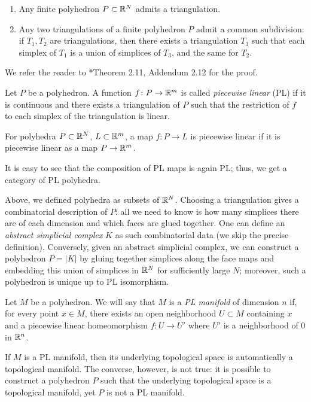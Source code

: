 \begin{theorem}\label{t:triangulation1}
  \par\noindent
  \begin{enumerate}
  \item
    Any finite polyhedron $P\subset \mathbb{R}^N$ admits a triangulation.
  \item
    Any two triangulations of a finite polyhedron $P$ admit a common
    subdivision: if $T_1,T_2$ are triangulations, then there exists a
    triangulation $T_3$ such that each simplex of $T_1$ is a union of simplices
    of $T_3$, and the same for $T_2$.
   \end{enumerate}
\end{theorem}
We refer the reader to *{Theorem 2.11, Addendum 2.12} for
the proof.
\begin{definition}
  Let $P$ be a polyhedron. A function $f\colon P\to \mathbb{R}^m$ is called \emph{%
  piecewise linear} (PL) if it is continuous and there exists a triangulation of
  $P$ such that the restriction of $f$ to each simplex of the triangulation
  is linear.

  For polyhedra $P\subset \mathbb{R}^N$, $L\subset \mathbb{R}^m$, a map $f\colon P\to L$
  is piecewise linear if it is piecewise linear as a map $P\to \mathbb{R}^m$.
\end{definition}
It is easy to see that the composition of PL maps is again PL; thus, we get a
category of PL polyhedra.

\begin{remark}
  Above, we defined polyhedra as subsets of $\mathbb{R}^N$. Choosing a triangulation
  gives a combinatorial description of $P$: all we need to know is how many
  simplices there are of each dimension and which faces are glued together. One
  can define an \emph{abstract simplicial complex} $K$ as such combinatorial
  data (we skip the precise definition). Conversely, given an abstract
  simplicial complex, we can construct a polyhedron $P=|K|$ by gluing together
  simplices along the face maps and embedding this union of simplices in $\mathbb{R}^N$
  for sufficiently large $N$; moreover, such a polyhedron is unique up to PL
  isomorphism.
\end{remark}

\begin{definition}\label{d:PLmanifold}
  Let $M$ be a polyhedron. We will say that $M$ is a \emph{PL manifold} of dimension $n$ if, for every point $x \in M$, there exists an open
  neighborhood $U \subset M$ containing $x$ and a piecewise linear homeomorphism
  $f\colon U \to U'$ where $U'$ is a neighborhood of 0 in $\mathbb{R}^n$.
\end{definition}
\begin{remark}
  If $M$ is a PL manifold, then its underlying topological space is
  automatically a topological manifold. The converse, however, is not true: it
  is possible to construct a polyhedron $P$ such that the underlying topological
  space is a topological manifold, yet $P$ is not a PL manifold.
\end{remark}

